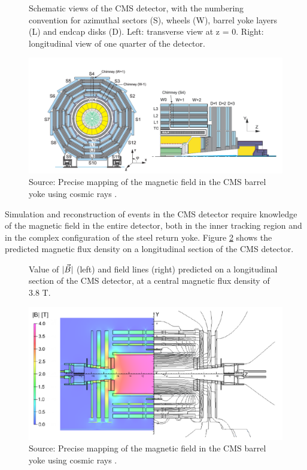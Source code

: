 \begin{figure}[H]
\caption{Schematic views of the CMS detector, with the numbering convention for azimuthal sectors (S),
wheels (W), barrel yoke layers (L) and endcap disks (D). Left: transverse view at z = 0. Right: longitudinal view of one quarter of the detector. \label{fig:yoke}}
  \centering
\includegraphics[width=15cm]{CMS_chapter_plots/yoke}
\caption*{Source: Precise mapping of the magnetic field in the CMS barrel yoke using cosmic rays \cite{1748-0221-5-03-T03021}.}
\end{figure}

Simulation and reconstruction of events in the CMS detector require knowledge of the magnetic
field in the entire detector, both in the inner tracking region and in the complex configuration of the
steel return yoke. Figure \ref{fig:mapas12} shows the predicted magnetic flux density on a longitudinal section of the CMS detector.

\begin{figure}[H]
\caption{Value of $\arrowvert \vec{B} \arrowvert$ (left) and field lines (right) predicted on a longitudinal section of the CMS detector, at a central magnetic flux density of 3.8 T. \label{fig:mapas12}  }
  \centering
\includegraphics[width=14cm]{CMS_chapter_plots/map}
\caption*{Source: Precise mapping of the magnetic field in the CMS barrel yoke using cosmic rays \cite{1748-0221-5-03-T03021}.}
\end{figure}


